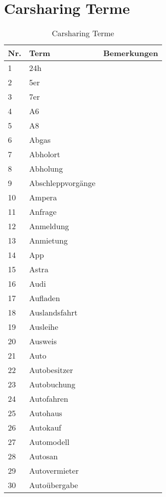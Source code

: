 %
\section{Carsharing Terme}\label{sec:list_original}
\begin{longtable}{|m{1.5cm}|m{3cm}|m{8.5cm}|}
	\caption{Carsharing Terme}\label{tbl:car_terme}\\%
	\hline
	\textbf{Nr.} & \textbf{Term} & \textbf{Bemerkungen}\\
	\hline \hline
	1 & 24h & \\
	\hline
	2 & 5er & \\
	\hline
	3 & 7er & \\
	\hline
	4 & A6 & \\
	\hline
	5 & A8 & \\
	\hline
	6 & Abgas & \\
	\hline
	7 & Abholort & \\
	\hline
	8 & Abholung & \\
	\hline
	9 & Abschleppvorgänge & \\
	\hline
	10 & Ampera & \\
	\hline
	11 & Anfrage & \\
	\hline
	12 & Anmeldung & \\
	\hline
	13 & Anmietung & \\
	\hline
	14 & App & \\
	\hline
	15 & Astra & \\
	\hline
	16 & Audi & \\
	\hline
	17 & Aufladen & \\
	\hline
	18 & Auslandsfahrt & \\
	\hline
	19 & Ausleihe & \\
	\hline
	20 & Ausweis & \\
	\hline
	21 & Auto & \\
	\hline
	22 & Autobesitzer & \\
	\hline
	23 & Autobuchung & \\
	\hline
	24 & Autofahren & \\
	\hline
	25 & Autohaus & \\
	\hline
	26 & Autokauf & \\
	\hline
	27 & Automodell & \\
	\hline
	28 & Autosan & \\
	\hline
	29 & Autovermieter & \\
	\hline
	30 & Autoübergabe & \\
	\hline

\end{longtable}
